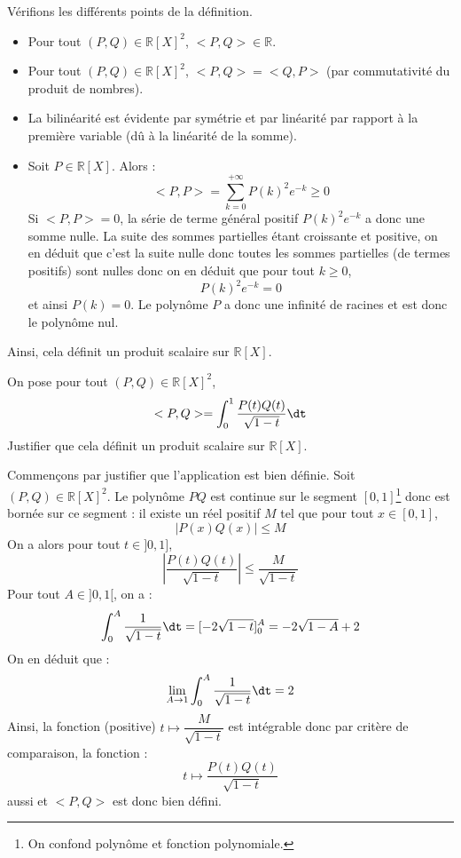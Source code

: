 \documentclass[a4paper,10pt]{report}
\begin{document}
\noindent Vérifions les différents points de la définition.

\begin{itemize}
\item Pour tout $(P,Q) \in \mathbb{R}[X]^2$, $<P,Q> \in \mathbb{R}$.
\item Pour tout $(P,Q) \in \mathbb{R}[X]^2$, $<P,Q>= <Q,P>$ (par commutativité du produit de nombres).
\item La bilinéarité est évidente par symétrie et par linéarité par rapport à la première variable (dû à la linéarité de la somme).
\item Soit $P \in \mathbb{R}[X]$. Alors :
$$ <P,P> = \sum_{k=0}^{+\infty} P(k)^2 e^{-k} \geq 0$$
Si $<P,P>=0$, la série de terme général positif $P(k)^2 e^{-k}$ a donc une somme nulle. La suite des sommes partielles étant croissante et positive, on en déduit que c'est la suite nulle donc toutes les sommes partielles (de termes positifs) sont nulles donc on en déduit que pour tout $k \geq 0$,
$$ P(k)^2 e^{-k} = 0$$
et ainsi $P(k)=0$. Le polynôme $P$ a donc une infinité de racines et est donc le polynôme nul.
\end{itemize}
Ainsi, cela définit un produit scalaire sur $\mathbb{R}[X]$.




\begin{Exercice}{}\label{PS} On pose pour tout $(P,Q) \in \mathbb{R}[X]^2$,
$$ <P,Q> = \int_{0}^1 \dfrac{P(t)Q(t)}{\sqrt{1-t}} \dt $$
Justifier que cela définit un produit scalaire sur $\mathbb{R}[X]$.
\end{Exercice}

\corr Commençons par justifier que l'application est bien définie. Soit $(P,Q) \in \mathbb{R}[X]^2$. Le polynôme $PQ$ est continue sur le segment $[0,1]$\footnote{On confond polynôme et fonction polynomiale.} donc est bornée sur ce segment : il existe un réel positif $M$ tel que pour tout $x \in [0,1]$,
$$ \vert P(x)Q(x) \vert \leq M$$
On a alors pour tout $t \in ]0,1]$,
$$ \left\vert  \dfrac{P(t)Q(t)}{\sqrt{1-t}} \right\vert \leq \dfrac{M}{\sqrt{1-t}}$$
Pour tout $A \in ]0,1[$, on a :
$$ \int_{0}^A \dfrac{1}{\sqrt{1-t}} \dt = [-2 \sqrt{1-t}]_0^A = - 2 \sqrt{1-A}+2$$
On en déduit que :
$$ \lim_{A \rightarrow 1}  \int_{0}^A \dfrac{1}{\sqrt{1-t}} \dt = 2$$
Ainsi, la fonction (positive) $t \mapsto \dfrac{M}{\sqrt{1-t}}$ est intégrable donc par critère de comparaison, la fonction :
$$ t \mapsto  \dfrac{P(t)Q(t)}{\sqrt{1-t}} $$
aussi et $<P,Q>$ est donc bien défini.

\medskip
\end{document}
